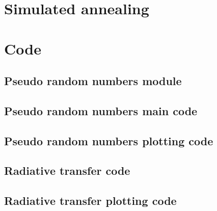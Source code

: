 \documentclass[twocolumn]{myarticle}
\begin{document}
\section{Simulated annealing}

\onecolumn

\section{Code}
\label{sec:code}

\subsection{Pseudo random numbers module}
\label{subsec:pseudo_random_numbers_module}


\vspace{10pt}

\subsection{Pseudo random numbers main code}
\label{subsec:pseudo_random_numbers_main_code}


\vspace{10pt}

\subsection{Pseudo random numbers plotting code}
\label{subsec:pseudo_random_numbers_plotting_code}


\vspace{10pt}

\subsection{Radiative transfer code}
\label{subsec:radiative_transfer_code}


\vspace{10pt}

\subsection{Radiative transfer plotting code}
\label{subsec:radiative_transfer_plotting_code}


\vspace{10pt}
\end{document}
